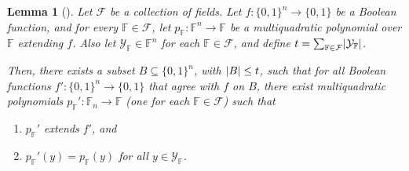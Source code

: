 \documentclass[english,12pt]{reedthesis}
\theoremstyle{plain}
\newtheorem{lemma}[lemma]{Lemma}
\theoremstyle{definition}
\theoremstyle{remark}
\DeclarePairedDelimiter{\abs}{\lvert}{\rvert}
\begin{document}
\begin{lemma}[{\cite[Lemma 4.5]{AW09}}]\label{lem:multiquad-adversary}
  Let $\mathcal{F}$ be a collection of fields. Let $f\colon \{0, 1\}^{n} \rightarrow \{0, 1\}$ be a
  Boolean function, and for every $\mathbb{F} \in \mathcal{F}$, let
  $p_{\mathbb{F}}\colon \mathbb{F}^{n} \rightarrow \mathbb{F}$ be a multiquadratic
  polynomial over $\mathbb{F}$ extending $f$. Also let
  $\mathcal{Y}_{\mathbb{F}} \in \mathbb{F}^{n}$ for each $\mathbb{F} \in \mathcal{F}$, and define
  $t = \sum_{\mathbb{F} \in \mathcal{F}}\abs{\mathcal{Y}_{\mathbb{F}}}$.

  Then, there exists a subset $B \subseteq \{0, 1\}^{n}$, with $\abs{B} \le t$, such that
  for all Boolean functions $f'\colon \{0, 1\}^{n} \rightarrow \{0, 1\}$ that agree with
  $f$ on $B$, there exist multiquadratic polynomials
  $p_{\mathbb{F}}'\colon \mathbb{F}_{n} \rightarrow \mathbb{F}$ (one for each
  $\mathbb{F} \in \mathcal{F}$) such that
  \begin{enumerate}
    \item $p_{\mathbb{F}}'$ extends $f'$, and
    \item $p_{\mathbb{F}}'(y) = p_{\mathbb{F}}(y)$ for all $y \in \mathcal{Y}_{\mathbb{F}}$.
  \end{enumerate}
\end{lemma}
\end{document}

